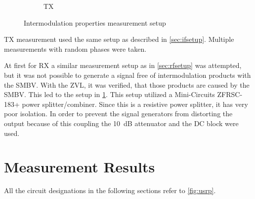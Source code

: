 \documentclass[12pt,a4paper,parskip=full,abstracton]{scrartcl}
\begin{document}
\begin{figure}[htb]
    \begin{subfigure}[t]{.5\linewidth}
        \centering
        \caption{TX}
    \end{subfigure}
    \caption{Intermodulation properties measurement setup}
    \label{fig:imsetup}
\end{figure}
TX measurement used the same setup as described in \cref{sec:ifsetup}. Multiple
measurements with random phases were taken.

At first for RX a similar measurement setup as in \cref{sec:rfsetup} was attempted,
but it was not possible to generate a signal free of intermodulation products with
the SMBV. With the ZVL, it was verified, that those products are caused by the
SMBV. This led to the setup in \cref{fig:imsetup}. This setup utilized a Mini-Circuits
ZFRSC-183+ power splitter/combiner. Since this is a resistive power splitter, it has
very poor isolation\cite{pwrsplit}. In order to prevent the signal generators from
distorting the output because of this coupling the \SI{10}{\deci\bel} attenuator
and the DC block were used.
\clearpage
\section{Measurement Results}
All the circuit designations in the following sections refer to \cref{fig:usrp}.
\end{document}
